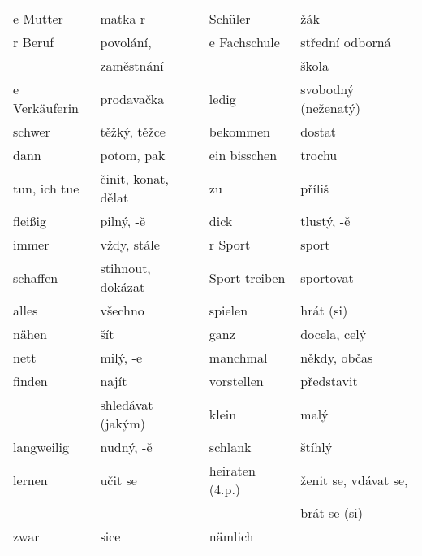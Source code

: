 \begin{widetext}
\begin{tabular}{llll}
          e Mutter           & matka r               & Schüler         & žák                   \\
          r Beruf            & povolání,             & e Fachschule    & střední odborná       \\
                             & zaměstnání            &                 & škola                 \\
          e Verkäuferin      & prodavačka            & ledig           & svobodný (neženatý)   \\
          schwer             & těžký, těžce          & bekommen        & dostat                \\
          dann               & potom, pak            & ein bisschen    & trochu                \\
          tun, ich tue       & činit, konat, dělat   & zu              & příliš                \\
          fleißig            & pilný, -ě             & dick            & tlustý, -ě            \\
          immer              & vždy, stále           & r Sport         & sport                 \\
          schaffen           & stihnout, dokázat     & Sport treiben   & sportovat             \\
          alles              & všechno               & spielen         & hrát (si)             \\
          nähen              & šít                   & ganz            & docela, celý          \\
          nett               & milý, -e              & manchmal        & někdy, občas          \\
          finden             & najít                 & vorstellen      & představit            \\
                             & shledávat (jakým)     & klein           & malý                  \\
          \hline 
          langweilig         & nudný, -ě             & schlank         & 
          štíhlý                \\
          lernen             & učit se               & heiraten (4.p.) & ženit se, vdávat 
          se,  \\
                             &                       &                 & brát se 
                             (si)          \\
          zwar               & sice                  & nämlich         & 

\end{tabular}
\end{widetext}
